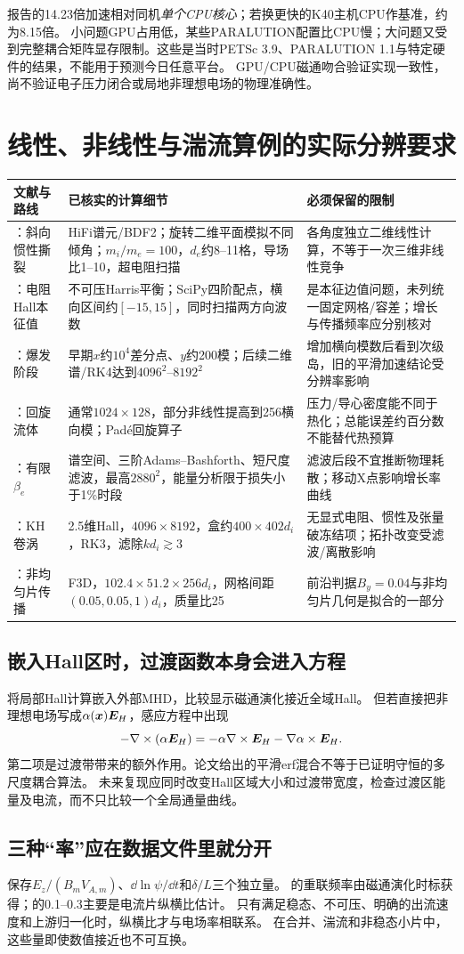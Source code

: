 报告的14.23倍加速相对同机\emph{单个CPU核心}；若换更快的K40主机CPU作基准，约为8.15倍。
小问题GPU占用低，某些PARALUTION配置比CPU慢；大问题又受到完整耦合矩阵显存限制。这些是当时PETSc 3.9、PARALUTION 1.1与特定硬件的结果，不能用于预测今日任意平台。
GPU/CPU磁通吻合验证实现一致性，尚不验证电子压力闭合或局地非理想电场的物理准确性。

\section{线性、非线性与湍流算例的实际分辨要求}
\begin{longtable}{P{29mm}P{64mm}P{55mm}}
\toprule 文献与路线 & 已核实的计算细节 & 必须保留的限制\\\midrule\endhead
\citet{L224}：斜向惯性撕裂 & HiFi谱元/BDF2；旋转二维平面模拟不同倾角；$m_i/m_e=100$，$d_e$约8--11格，导场比1--10，超电阻扫描 & 各角度独立二维线性计算，不等于一次三维非线性竞争\\
\citet{L268}：电阻Hall本征值 & 不可压Harris平衡；SciPy四阶配点，横向区间约$[-15,15]$，同时扫描两方向波数 & 是本征边值问题，未列统一固定网格/容差；增长与传播频率应分别核对\\
\citet{L191,L214,F697}：爆发阶段 & 早期$x$约$10^4$差分点、$y$约200模；后续二维谱/RK4达到$4096^2$--$8192^2$ & 增加横向模数后看到次级岛，旧的平滑加速结论受分辨率影响\\
\citet{E471,E472}：回旋流体 & 通常$1024\times128$，部分非线性提高到256横向模；Padé回旋算子 & 压力/导心密度能不同于热化；总能误差约百分数不能替代热预算\\
\citet{E474}：有限$\beta_e$ & 谱空间、三阶Adams--Bashforth、短尺度滤波，最高$2880^2$，能量分析限于损失小于1\%时段 & 滤波后段不宜推断物理耗散；移动X点影响增长率曲线\\
\citet{F644}：KH卷涡 & 2.5维Hall，$4096\times8192$，盒约$400\times402d_i$，RK3，滤除$kd_i\gtrsim3$ & 无显式电阻、惯性及张量破冻结项；拓扑改变受滤波/离散影响\\
\citet{L294}：非均匀片传播 & F3D，$102.4\times51.2\times256d_i$，网格间距$(0.05,0.05,1)d_i$，质量比25 & 前沿判据$B_y=0.04$与非均匀片几何是拟合的一部分\\
\bottomrule
\end{longtable}

\subsection{嵌入Hall区时，过渡函数本身会进入方程}
\citet{L035}将局部Hall计算嵌入外部MHD，比较显示磁通演化接近全域Hall。
但若直接把非理想电场写成$\alpha(\bm{x})\bm{E}_H$，感应方程中出现
\begin{equation}
 -\nabla\times(\alpha\bm{E}_H)=-\alpha\nabla\times\bm{E}_H-\nabla\alpha\times\bm{E}_H.
\end{equation}
第二项是过渡带带来的额外作用。论文给出的平滑erf混合不等于已证明守恒的多尺度耦合算法。
未来复现应同时改变Hall区域大小和过渡带宽度，检查过渡区能量及电流，而不只比较一个全局通量曲线。

\subsection{三种“率”应在数据文件里就分开}
保存$E_z/(B_mV_{\!A,m})$、$\dd\ln\psi/\dd t$和$\delta/L$三个独立量。
\citet{L264}的重联频率由磁通演化时标获得；\citet{F644}的0.1--0.3主要是电流片纵横比估计。
只有满足稳态、不可压、明确的出流速度和上游归一化时，纵横比才与电场率相联系。
在合并、湍流和非稳态小片中，这些量即使数值接近也不可互换。

